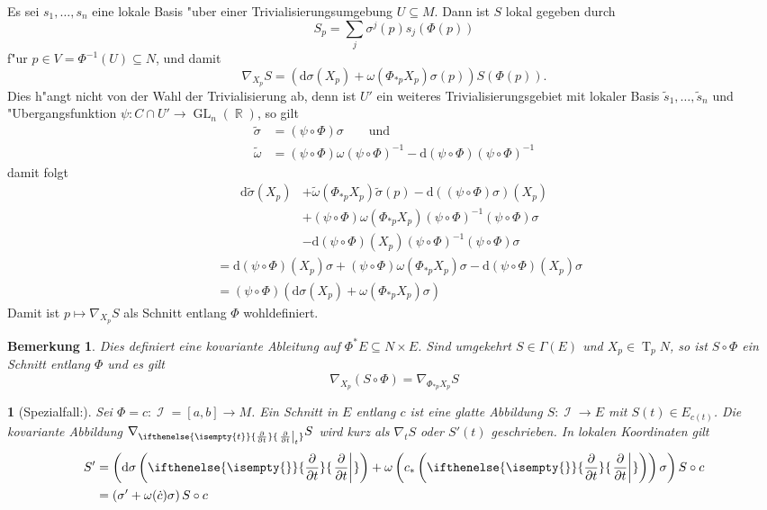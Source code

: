 \documentclass[paper=A4, twoside, chapterprefix=true, bibliography=totoc, headsepline]{scrbook}
\DeclareMathOperator{\R}{\mathbb{R}}
\DeclareMathOperator{\calI}{\mathcal{I}}
\DeclareMathOperator{\GL}{GL} %
\DeclareMathOperator{\T}{T} %
\newcommand{\dop}{\mathrm{d}}
\newcommand{\X}{\times}
\newcommand{\pdifffrac}[3][]{\ifthenelse{\isempty{#1}}{\frac{\partial #2}{\partial #3}}{\left. \frac{\partial #2}{\partial #3} \right|_{#1}}}
\theoremstyle{plain}
\theoremstyle{nonumberplain}
\newtheorem{bem}{Bemerkung}
\theoremstyle{empty}
\newtheorem{emptythm}{}%
\theoremstyle{break}
\begin{document}
Es sei $s_1,\ldots ,s_n$ eine lokale Basis "uber einer Trivialisierungsumgebung $U \subseteq M$. Dann ist $S$ lokal gegeben durch
\[ S_p = \sum_j \sigma^j(p) s_j(\Phi(p)) \]
f"ur $p \in V = \Phi^{-1}(U) \subseteq N$, und damit
\[ \nabla_{X_p}S = \left( \dop \sigma(X_p) + \omega(\Phi_{*p}X_p) \sigma(p) \right) S(\Phi(p)).\]
Dies h"angt nicht von der Wahl der Trivialisierung ab, denn ist $U'$ ein weiteres Trivialisierungsgebiet mit lokaler Basis $\tilde s_1, \ldots , \tilde s_n$ und "Ubergangsfunktion $\psi: C \cap U' \to \GL_n(\R)$, so gilt
\begin{align*}
  \tilde\sigma &= (\psi \circ \Phi) \sigma \qquad \text{und}\\
  \tilde\omega &= (\psi \circ \Phi) \omega(\psi \circ \Phi)^{-1} - \dop (\psi \circ \Phi)(\psi \circ \Phi)^{-1}
\end{align*}
damit folgt
\begin{align*}
  \dop \tilde\sigma(X_p) &+ \tilde\omega(\Phi_{*p}X_p) \tilde\sigma(p) - \dop((\psi \circ \Phi)\sigma) (X_p)\\
  &+ (\psi \circ \Phi) \omega (\Phi_{*p}X_p)(\psi \circ \Phi)^{-1}(\psi \circ \Phi)\sigma\\
  &- \dop(\psi \circ \Phi)(X_p)(\psi \circ \Phi)^{-1}(\psi \circ \Phi)\sigma
\end{align*}\begin{align*}
  &= \dop(\psi \circ \Phi)(X_p)\sigma + (\psi \circ \Phi)\omega(\Phi_{*p}X_p)\sigma - \dop(\psi \circ \Phi)(X_p)\sigma\\
  &= (\psi \circ \Phi)(\dop\sigma(X_p) + \omega(\Phi_{*p}X_p)\sigma)
\end{align*}
Damit ist $p \mapsto \nabla_{X_p}S$ als Schnitt entlang $\Phi$ wohldefiniert.
\begin{bem}
  Dies definiert eine kovariante Ableitung auf $\Phi^*E \subseteq N \X E$.
  Sind umgekehrt $S \in \Gamma(E)$ und $X_p \in \T_pN$, so ist $S \circ \Phi$ ein Schnitt entlang $\Phi$ und es gilt
  \[ \nabla_{X_p}(S \circ \Phi) = \nabla_{\Phi_{*p}X_p}S \]
\end{bem}

\begin{emptythm}[Spezialfall:]
  Sei $\Phi = c : \calI = [a,b] \to M$.
  Ein Schnitt in $E$ entlang $c$ ist eine glatte Abbildung $S: \calI \to E$ mit $S(t) \in E_{c(t)}$.
  Die kovariante Abbildung $\nabla_{\pdifffrac[t]{}{t}} S$ wird kurz als $\nabla_tS$ oder $S'(t)$ geschrieben.
  In lokalen Koordinaten gilt
  \begin{align*}
    S' &= \left( \dop \sigma \left( \pdifffrac{}{t} \right) + \omega\left( c_* \left( \pdifffrac{}{t} \right) \right) \sigma \right) S \circ c\\
    &= \left( \sigma' + \omega(\dot c) \sigma \right) S \circ c
  \end{align*}
\end{emptythm}
\end{document}
